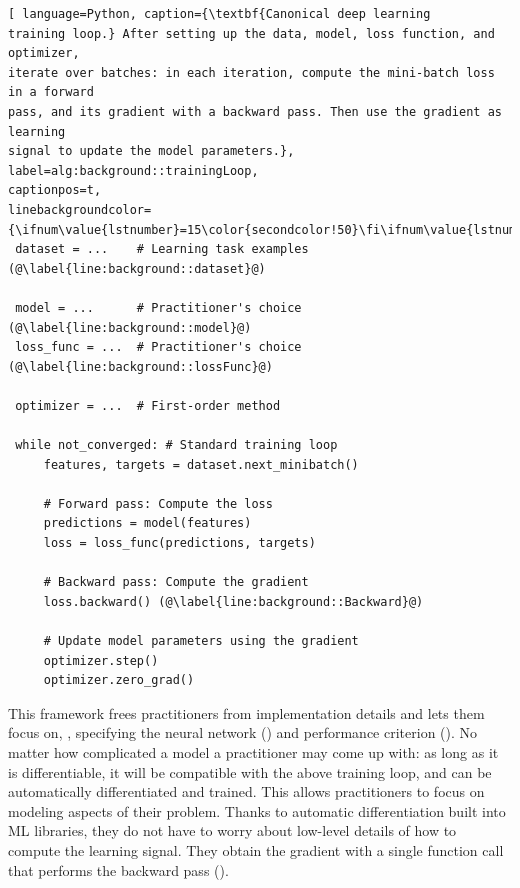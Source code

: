 \begin{lstlisting}[ language=Python, caption={\textbf{Canonical deep learning
training loop.} After setting up the data, model, loss function, and optimizer,
iterate over batches: in each iteration, compute the mini-batch loss in a forward
pass, and its gradient with a backward pass. Then use the gradient as learning
signal to update the model parameters.}, label=alg:background::trainingLoop,
captionpos=t,
linebackgroundcolor={\ifnum\value{lstnumber}=15\color{secondcolor!50}\fi\ifnum\value{lstnumber}=16\color{secondcolor!50}\fi}]
 dataset = ...    # Learning task examples (@\label{line:background::dataset}@)

 model = ...      # Practitioner's choice (@\label{line:background::model}@)
 loss_func = ...  # Practitioner's choice (@\label{line:background::lossFunc}@)

 optimizer = ...  # First-order method

 while not_converged: # Standard training loop
     features, targets = dataset.next_minibatch()

     # Forward pass: Compute the loss
     predictions = model(features)
     loss = loss_func(predictions, targets)

     # Backward pass: Compute the gradient
     loss.backward() (@\label{line:background::Backward}@)

     # Update model parameters using the gradient
     optimizer.step()
     optimizer.zero_grad()
\end{lstlisting}

This framework frees practitioners from implementation details and lets them
focus on, \eg, specifying the neural network () and
performance criterion (). No matter how
complicated a model a practitioner may come up with: as long as it is
differentiable, it will be compatible with the above training loop, and can be
automatically differentiated and trained. This allows practitioners to focus on
modeling aspects of their problem. Thanks to automatic differentiation built
into ML libraries, they do not have to worry about low-level details of how to
compute the learning signal. They obtain the gradient with a single function
call that performs the backward pass ().

